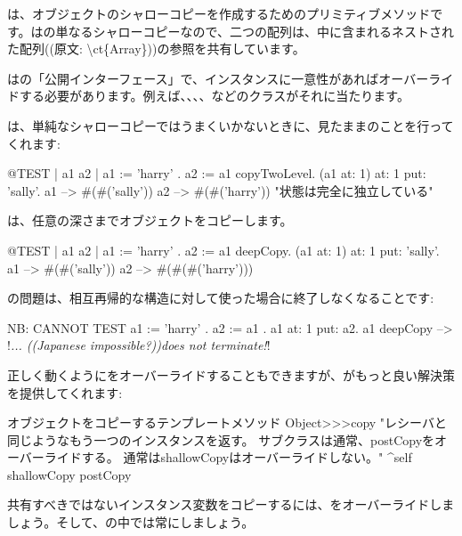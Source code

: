 \documentclass[a4paper,10pt,twoside]{book}
\begin{document}
は、オブジェクトのシャローコピーを作成するためのプリミティブメソッドです。はの単なるシャローコピーなので、二つの配列は、中に含まれるネストされた配列((原文: \textbackslash ct\{Array\}))の参照を共有しています。

はの「公開インターフェース」で、インスタンスに一意性があればオーバーライドする必要があります。例えば、、、、などのクラスがそれに当たります。

は、単純なシャローコピーではうまくいかないときに、見たままのことを行ってくれます:

\begin{code}{@TEST | a1 a2 |}
a1 := { { 'harry' } } .
a2 := a1 copyTwoLevel.
(a1 at: 1) at: 1 put: 'sally'.
a1 --> #(#('sally'))
a2 --> #(#('harry'))    "状態は完全に独立している"
\end{code}

は、任意の深さまでオブジェクトをコピーします。

\begin{code}{@TEST | a1 a2 |}
a1 := { { { 'harry' } } } .
a2 := a1 deepCopy.
(a1 at: 1) at: 1 put: 'sally'.
a1 --> #(#('sally'))
a2 --> #(#(#('harry')))
\end{code}

の問題は、相互再帰的な構造に対して使った場合に終了しなくなることです:

\begin{code}{NB: CANNOT TEST}
a1 := { 'harry' }.
a2 := { a1 }.
a1 at: 1 put: a2.
a1 deepCopy --> !\emph{... ((Japanese impossible?))does not terminate!}!
\end{code}

正しく動くようにをオーバーライドすることもできますが、がもっと良い解決策を提供してくれます:

\begin{method}{オブジェクトをコピーするテンプレートメソッド}
Object>>>copy
    "レシーバと同じようなもう一つのインスタンスを返す。
    サブクラスは通常、postCopyをオーバーライドする。
    通常はshallowCopyはオーバーライドしない。"
    ^self shallowCopy postCopy
\end{method}

共有すべきではないインスタンス変数をコピーするには、をオーバーライドしましょう。そして、の中では常にしましょう。
\end{document}
